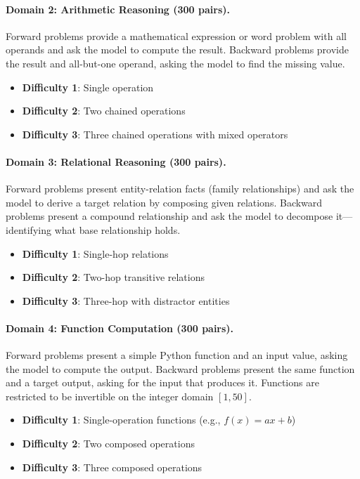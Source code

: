 \documentclass{article}
\begin{document}
\paragraph{Domain 2: Arithmetic Reasoning (300 pairs).}
Forward problems provide a mathematical expression or word problem with all operands and ask the model to compute the result. Backward problems provide the result and all-but-one operand, asking the model to find the missing value.
\begin{itemize}
    \item \textbf{Difficulty 1}: Single operation
    \item \textbf{Difficulty 2}: Two chained operations
    \item \textbf{Difficulty 3}: Three chained operations with mixed operators
\end{itemize}

\paragraph{Domain 3: Relational Reasoning (300 pairs).}
Forward problems present entity-relation facts (family relationships) and ask the model to derive a target relation by composing given relations. Backward problems present a compound relationship and ask the model to decompose it---identifying what base relationship holds.
\begin{itemize}
    \item \textbf{Difficulty 1}: Single-hop relations
    \item \textbf{Difficulty 2}: Two-hop transitive relations
    \item \textbf{Difficulty 3}: Three-hop with distractor entities
\end{itemize}

\paragraph{Domain 4: Function Computation (300 pairs).}
Forward problems present a simple Python function and an input value, asking the model to compute the output. Backward problems present the same function and a target output, asking for the input that produces it. Functions are restricted to be invertible on the integer domain $[1, 50]$.
\begin{itemize}
    \item \textbf{Difficulty 1}: Single-operation functions (e.g., $f(x) = ax + b$)
    \item \textbf{Difficulty 2}: Two composed operations
    \item \textbf{Difficulty 3}: Three composed operations
\end{itemize}
\end{document}
